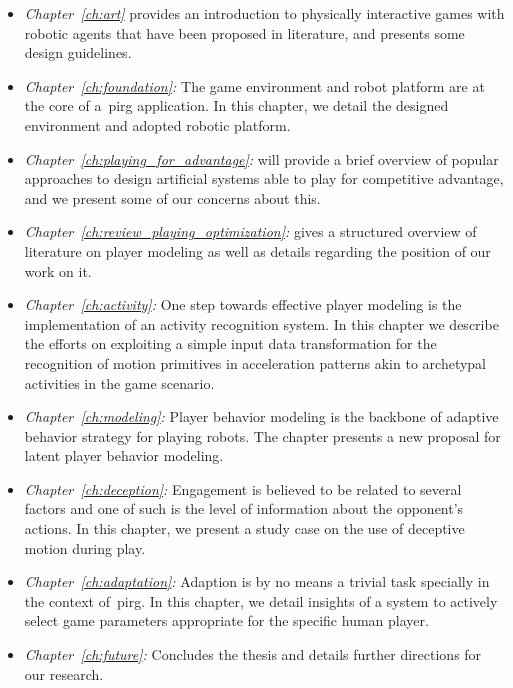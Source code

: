 \begin{itemize}
\item\emph{Chapter~\ref{ch:art}} provides an introduction to physically interactive games with robotic agents that have been proposed in literature, and presents some design guidelines. %
\item\emph{Chapter~\ref{ch:foundation}:} The game environment and robot platform are at the core of a~\gls{pirg} application. In this chapter, we detail the designed environment and adopted robotic platform.
\item\emph{Chapter~\ref{ch:playing_for_advantage}:} will provide a brief overview of popular approaches to design artificial systems able to play for competitive advantage, and we present some of our concerns about this. 
\item\emph{Chapter~\ref{ch:review_playing_optimization}:} gives a structured overview of literature on player modeling as well as details regarding the position of our work on it.
\item\emph{Chapter~\ref{ch:activity}:} One step towards effective player modeling is the implementation of an activity recognition system. In this chapter we describe the efforts on exploiting a simple input data transformation for the recognition of motion primitives in acceleration patterns akin to archetypal activities in the game scenario.
\item\emph{Chapter~\ref{ch:modeling}:} Player behavior modeling is the backbone of adaptive behavior strategy for playing robots. The chapter presents a new proposal for latent player behavior modeling.
\item\emph{Chapter~\ref{ch:deception}:} Engagement is believed to be related to several factors and one of such is the level of information about the opponent's actions. In this chapter, we present a study case on the use of deceptive motion during play.
\item\emph{Chapter~\ref{ch:adaptation}:} Adaption is by no means a trivial task specially in the context of~\gls{pirg}. In this chapter, we detail insights of a system to actively select game parameters appropriate for the specific human player.
\item\emph{Chapter~\ref{ch:future}:} Concludes the thesis and details further directions for our research.
\end{itemize}

